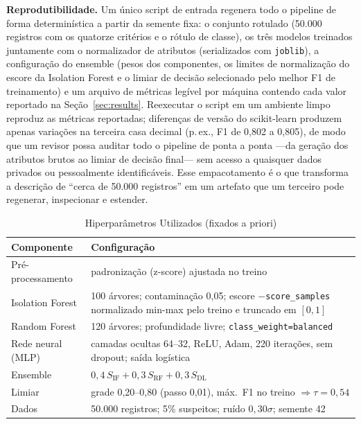 \documentclass[conference]{IEEEtran}
\begin{document}
\textbf{Reprodutibilidade.} Um único script de entrada regenera todo o
pipeline de forma determinística a partir da semente fixa: o conjunto
rotulado (50.000 registros com os quatorze critérios e o rótulo de
classe), os três modelos treinados juntamente com o normalizador de
atributos (serializados com \texttt{joblib}), a configuração do ensemble
(pesos dos componentes, os limites de normalização do escore da
Isolation Forest e o limiar de decisão selecionado pelo melhor F1 de
treinamento) e um arquivo de métricas legível por máquina contendo cada
valor reportado na Seção~\ref{sec:results}. Reexecutar o script em um
ambiente limpo reproduz as métricas reportadas; diferenças de versão do
scikit-learn produzem apenas variações na terceira casa decimal (p.\,ex.,
F1 de 0,802 a 0,805), de
modo que um revisor possa auditar todo o pipeline de ponta a ponta ---da
geração dos atributos brutos ao limiar de decisão final--- sem acesso a
quaisquer dados privados ou pessoalmente identificáveis. Esse
empacotamento é o que transforma a descrição de ``cerca de 50.000
registros'' em um artefato que um terceiro pode regenerar, inspecionar e
estender.

\begin{table}[t]
\caption{Hiperparâmetros Utilizados (fixados a priori)}
\label{tab:hyper}
\centering
\footnotesize
\setlength{\tabcolsep}{3pt}
\renewcommand{\arraystretch}{1.15}
\begin{tabular}{@{}p{1.9cm}p{6.0cm}@{}}
\toprule
\textbf{Componente} & \textbf{Configuração} \\
\midrule
Pré-processamento & padronização (z-score) ajustada no treino \\
Isolation Forest & 100 árvores; contaminação 0,05; escore $-$\texttt{score\_samples} normalizado min-max pelo treino e truncado em $[0,1]$ \\
Random Forest & 120 árvores; profundidade livre; \texttt{class\_weight=balanced} \\
Rede neural (MLP) & camadas ocultas 64--32, ReLU, Adam, 220 iterações, sem dropout; saída logística \\
Ensemble & $0{,}4\,S_{\mathrm{IF}}+0{,}3\,S_{\mathrm{RF}}+0{,}3\,S_{\mathrm{DL}}$ \\
Limiar & grade 0,20--0,80 (passo 0,01), máx.\ F1 no treino $\Rightarrow\tau=0{,}54$ \\
Dados & 50.000 registros; 5\% suspeitos; ruído $0{,}30\sigma$; semente 42 \\
\bottomrule
\end{tabular}
\end{table}
\end{document}
